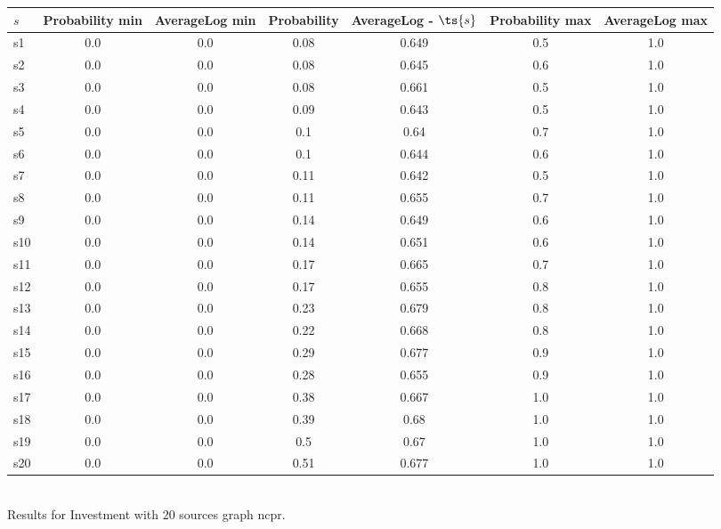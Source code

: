 \documentclass{article}
\begin{document}
\noindent\begin{tabular}{|l|c|c|c|c|c|c|}
\hline
$s$& Probability min & AverageLog min & Probability & AverageLog - $\ts{s}$ & Probability max & AverageLog max\\
\hline
s1 &0.0 & 0.0 & 0.08 & 0.649 & 0.5 & 1.0\\
\hline
s2 &0.0 & 0.0 & 0.08 & 0.645 & 0.6 & 1.0\\
\hline
s3 &0.0 & 0.0 & 0.08 & 0.661 & 0.5 & 1.0\\
\hline
s4 &0.0 & 0.0 & 0.09 & 0.643 & 0.5 & 1.0\\
\hline
s5 &0.0 & 0.0 & 0.1 & 0.64 & 0.7 & 1.0\\
\hline
s6 &0.0 & 0.0 & 0.1 & 0.644 & 0.6 & 1.0\\
\hline
s7 &0.0 & 0.0 & 0.11 & 0.642 & 0.5 & 1.0\\
\hline
s8 &0.0 & 0.0 & 0.11 & 0.655 & 0.7 & 1.0\\
\hline
s9 &0.0 & 0.0 & 0.14 & 0.649 & 0.6 & 1.0\\
\hline
s10 &0.0 & 0.0 & 0.14 & 0.651 & 0.6 & 1.0\\
\hline
s11 &0.0 & 0.0 & 0.17 & 0.665 & 0.7 & 1.0\\
\hline
s12 &0.0 & 0.0 & 0.17 & 0.655 & 0.8 & 1.0\\
\hline
s13 &0.0 & 0.0 & 0.23 & 0.679 & 0.8 & 1.0\\
\hline
s14 &0.0 & 0.0 & 0.22 & 0.668 & 0.8 & 1.0\\
\hline
s15 &0.0 & 0.0 & 0.29 & 0.677 & 0.9 & 1.0\\
\hline
s16 &0.0 & 0.0 & 0.28 & 0.655 & 0.9 & 1.0\\
\hline
s17 &0.0 & 0.0 & 0.38 & 0.667 & 1.0 & 1.0\\
\hline
s18 &0.0 & 0.0 & 0.39 & 0.68 & 1.0 & 1.0\\
\hline
s19 &0.0 & 0.0 & 0.5 & 0.67 & 1.0 & 1.0\\
\hline
s20 &0.0 & 0.0 & 0.51 & 0.677 & 1.0 & 1.0\\
\hline
\end{tabular}\\

\noindent Results for Investment with 20 sources graph ncpr.
\end{document}

